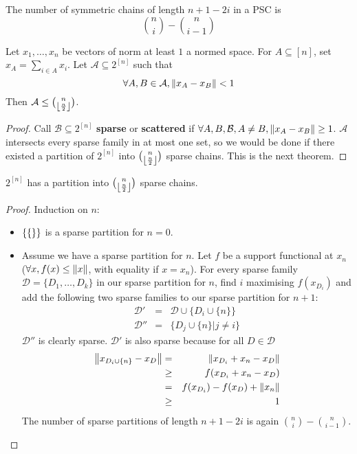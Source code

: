 \documentclass{article}
\begin{document}
The number of symmetric chains of length $n + 1 - 2i$ in a PSC is
$$\binom n i - \binom n{i - 1}$$

\begin{nthm}
  Let $x_1, \dots, x_n$ be vectors of norm at least $1$ a normed space. For $A \subseteq [n]$, set $x_A = \sum_{i \in A} x_i$. Let $\mathcal A \subseteq 2^{[n]}$ such that
  $$\forall A, B \in \mathcal A, \left\lVert x_A - x_B\right\rVert < 1$$
  Then $\mathcal A \le \binom n{\left\lfloor \frac n2\right\rfloor}$.
\end{nthm}
\begin{proof}
  Call $\mathcal B \subseteq 2^{[n]}$ {\bf sparse} or {\bf scattered} if $\forall A, B, \mathcal B, A \ne B, \left\lVert x_A - x_B\right\rVert \ge 1$. $\mathcal A$ intersects every sparse family in at most one set, so we would be done if there existed a partition of $2^{[n]}$ into $\binom n{\left\lfloor \frac n2\right\rfloor}$ sparse chains. This is the next theorem.
\end{proof}

\begin{nthm}[Kleitman]
  $2^{[n]}$ has a partition into $\binom n{\left\lfloor \frac n2\right\rfloor}$ sparse chains.
\end{nthm}
\begin{proof}
  Induction on $n$:
  \begin{itemize}
    \item $\{\{\empty\}\}$ is a sparse partition for $n = 0$.
    \item Assume we have a sparse partition for $n$. Let $f$ be a support functional at $x_n$ ($\forall x, f(x) \le \left\lVert x\right\rVert$, with equality if $x = x_n$). For every sparse family $\mathcal D = \{D_1, \dots, D_k\}$ in our sparse partition for $n$, find $i$ maximising $f(x_{D_i})$ and add the following two sparse families to our sparse partition for $n + 1$: 
    \begin{eqnarray*}
      \mathcal D' & = & \mathcal D \cup \{D_i \cup \{n\}\} \\
      \mathcal D'' & = & \{D_j \cup \{n\} | j \ne i\}
    \end{eqnarray*}
    $\mathcal D''$ is clearly sparse. $\mathcal D'$ is also sparse because for all 
    $D \in \mathcal D$
    \begin{eqnarray*}
      \left\lVert x_{D_i \cup \{n\}} - x_D\right\rVert
      & = & \left\lVert x_{D_i} + x_n - x_D\right\rVert \\
      & \ge & f(x_{D_i} + x_n - x_D) \\
      & = & f(x_{D_i}) - f(x_D) + \left\lVert x_n\right\rVert \\
      & \ge & 1
    \end{eqnarray*}
    The number of sparse partitions of length $n + 1 - 2i$ is again $\binom ni - \binom n{i - 1}$.
  \end{itemize}
\end{proof}

\newlec

\printindex
\end{document}

